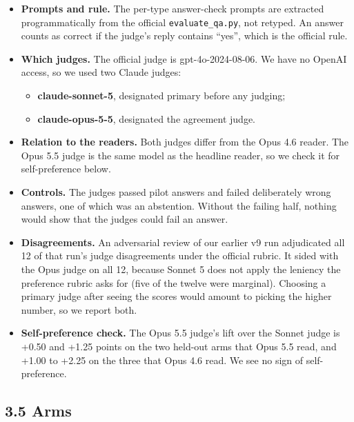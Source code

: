 \documentclass[11pt]{article}
\providecommand{\tightlist}{\setlength{\itemsep}{0pt}\setlength{\parskip}{0pt}}
\begin{document}
\begin{itemize}
\tightlist
\item
  \textbf{Prompts and rule.} The per-type answer-check prompts are extracted programmatically from the official
  \texttt{evaluate\_qa.py}, not retyped. An answer counts as correct if the judge's reply contains ``yes'', which is
  the official rule.
\item
  \textbf{Which judges.} The official judge is gpt-4o-2024-08-06. We have no OpenAI access, so we used two
  Claude judges:

  \begin{itemize}
  \tightlist
  \item
    \textbf{claude-sonnet-5}, designated primary before any judging;
  \item
    \textbf{claude-opus-5-5}, designated the agreement judge.
  \end{itemize}
\item
  \textbf{Relation to the readers.} Both judges differ from the Opus 4.6 reader. The Opus 5.5 judge is the same
  model as the headline reader, so we check it for self-preference below.
\item
  \textbf{Controls.} The judges passed pilot answers and failed deliberately wrong answers, one of which was an
  abstention. Without the failing half, nothing would show that the judges could fail an answer.
\item
  \textbf{Disagreements.} An adversarial review of our earlier v9 run adjudicated all 12 of that run's judge
  disagreements under the official rubric. It sided with the Opus judge on all 12, because Sonnet 5 does
  not apply the leniency the preference rubric asks for (five of the twelve were marginal). Choosing a primary judge after seeing the scores
  would amount to picking the higher number, so we report both.
\item
  \textbf{Self-preference check.} The Opus 5.5 judge's lift over the Sonnet judge is +0.50 and +1.25 points on
  the two held-out arms that Opus 5.5 read, and +1.00 to +2.25 on the three that Opus 4.6 read. We see no
  sign of self-preference.
\end{itemize}

\hypertarget{arms}{%
\subsection{3.5 Arms}\label{arms}}
\end{document}
